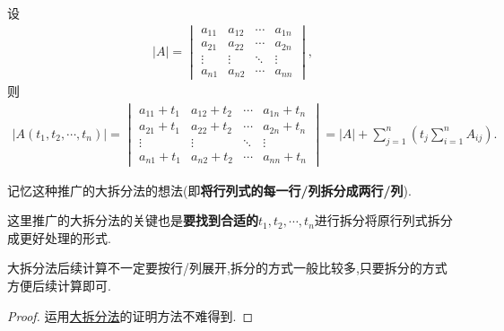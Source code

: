 \documentclass[../../main.tex]{subfiles}%
\begin{document}
\begin{corollary}\label{大拆分法的推广}
设
\begin{align*}
|A| = 
\begin{vmatrix}
a_{11} & a_{12} & \cdots & a_{1n} \\
a_{21} & a_{22} & \cdots & a_{2n} \\
\vdots & \vdots & \ddots & \vdots \\
a_{n1} & a_{n2} & \cdots & a_{nn}
\end{vmatrix},
\nonumber
\end{align*}
则
\begin{align*}
|A(t_1,t_2,\cdots,t_n)| = 
\begin{vmatrix}
a_{11}+t_1 & a_{12}+t_2 & \cdots & a_{1n}+t_n \\
a_{21}+t_1 & a_{22}+t_2 & \cdots & a_{2n}+t_n \\
\vdots & \vdots & \ddots & \vdots \\
a_{n1}+t_1 & a_{n2}+t_2 & \cdots & a_{nn}+t_n
\end{vmatrix}
= |A| + \sum_{j = 1}^{n} \left( t_j \sum_{i = 1}^{n} A_{ij} \right).
\nonumber
\end{align*}
\end{corollary}
\begin{note}
记忆这种推广的大拆分法的想法(即\textbf{将行列式的每一行/列拆分成两行/列}).

这里推广的大拆分法的关键也是\textbf{要找到合适的$t_1,t_2,\cdots,t_n$}进行拆分将原行列式拆分成更好处理的形式.
\end{note}
\begin{remark}
大拆分法后续计算不一定要按行/列展开,拆分的方式一般比较多,只要拆分的方式方便后续计算即可.
\end{remark}
\begin{proof}
运用\hyperlink{大拆分法}{大拆分法}的证明方法不难得到.
\end{proof}
\end{document}
